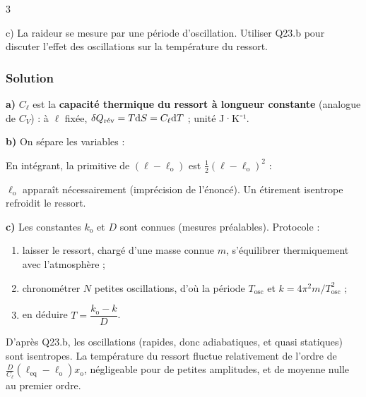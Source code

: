 \documentclass[11pt,a4paper]{article}
\providecommand{\tightlist}{\setlength{\itemsep}{0pt}\setlength{\parskip}{0pt}}
\newcommand{\equationajustee}[1]{%
  \sbox{\boiteequation}{$\displaystyle #1$}%
  \ifdim\wd\boiteequation>\linewidth
    \[\resizebox{\linewidth}{!}{\usebox{\boiteequation}}\]%
  \else
    \[#1\]%
  \fi}
\begin{document}
\begin{indication}{3}

c) La raideur se mesure par une période d'oscillation. Utiliser Q23.b pour discuter l'effet des oscillations sur la température du ressort.

\end{indication}

\hypertarget{solution-22}{%
\subsubsection{Solution}\label{solution-22}}

\textbf{a)} \(C_\ell\) est la \textbf{capacité thermique du ressort à longueur constante} (analogue de \(C_V\)) : à \(\ell\) fixée, \(\delta Q_{\text{\text{rév}}}=T\mathrm{d}S=C_\ell\mathrm{d}T\) ; unité J·K⁻¹.

\textbf{b)} On sépare les variables :

\equationajustee{C_\ell\frac{\mathrm{d}T}{T}=-D(\ell-\ell_{\mathrm{o}})\mathrm{d}\ell}

En intégrant, la primitive de \((\ell-\ell_{\mathrm{o}})\) est \(\frac12(\ell-\ell_{\mathrm{o}})^2\) :

\equationajustee{\boxed{T_f=T_i\exp\left(-\frac D{2C_\ell}\left[(\ell_f-\ell_{\mathrm{o}})^2-(\ell_i-\ell_{\mathrm{o}})^2\right]\right)}}

\(\ell_{\mathrm{o}}\) apparaît nécessairement (imprécision de l'énoncé). Un étirement isentrope refroidit le ressort.

\textbf{c)} Les constantes \(k_{\mathrm{o}}\) et \(D\) sont connues (mesures préalables). Protocole :

\begin{enumerate}
\def\labelenumi{\arabic{enumi}.}
\tightlist
\item
  laisser le ressort, chargé d'une masse connue \(m\), s'équilibrer thermiquement avec l'atmosphère ;
\item
  chronométrer \(N\) petites oscillations, d'où la période \(T_{\text{osc}}\) et \(k=4\pi^2m/T_{\text{osc}}^2\) ;
\item
  en déduire \(\boxed{T=\dfrac{k_{\mathrm{o}}-k}{D}}\).
\end{enumerate}

D'après Q23.b, les oscillations (rapides, donc adiabatiques, et quasi statiques) sont isentropes. La température du ressort fluctue relativement de l'ordre de \(\frac D{C_\ell}(\ell_{\text{eq}}-\ell_{\mathrm{o}})x_{\mathrm{o}}\), négligeable pour de petites amplitudes, et de moyenne nulle au premier ordre.
\end{document}
